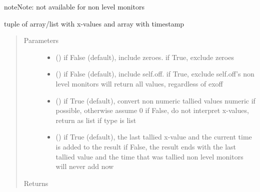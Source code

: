 \documentclass[letterpaper,10pt,english]{sphinxmanual}
\begin{document}
\begin{fulllineitems}
\begin{fulllineitems}
\begin{sphinxadmonition}{note}{Note:}
not available for non level monitors
\end{sphinxadmonition}

\end{fulllineitems}


\begin{fulllineitems}
\label{\detokenize{Reference:salabim.Monitor.xt}}
tuple of array/list with x-values and array with timestamp
\begin{quote}\begin{description}
\item[{Parameters}] \leavevmode\begin{itemize}
\item {} 
 () \textendash{} if False (default), include zeroes. if True, exclude zeroes

\item {} 
 () \textendash{} if False (default), include self.off. if True, exclude self.off’s 
non level monitors will return all values, regardless of exoff

\item {} 
 () \textendash{} if True (default), convert non numeric tallied values numeric if possible, otherwise assume 0 
if False, do not interpret x-values, return as list if type is list

\item {} 
 () \textendash{} if True (default), the last tallied x-value and the current time is added to the result 
if False, the result ends with the last tallied value and the time that was tallied 
non level monitors will never add now

\end{itemize}

\item[{Returns}] \leavevmode
{}


\end{description}
\end{quote}
\end{fulllineitems}
\end{fulllineitems}
\end{document}
